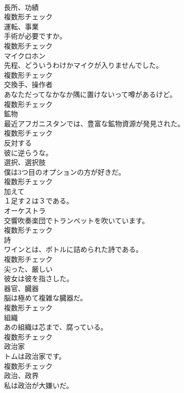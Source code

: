 \documentclass[8pt]{extreport}
\begin{document}
\begin{CJK}{UTF8}{min}
\\	[名詞]	⻑所、功績	
\\	複数形チェック
\\	[名詞]	運転、事業	
\\	手術が必要ですか。	
\\	複数形チェック
\\	[名詞]	マイクロホン	
\\	先程、どういうわけかマイクが入りませんでした。	
\\	複数形チェック
\\	[名詞]	交換手、操作者	
\\	あなただってなかなか隅に置けないって噂があるけど。	
\\	複数形チェック
\\	[名詞]	鉱物	
\\	最近アフガニスタンでは、豊富な鉱物資源が発見された。	
\\	複数形チェック
\\	[動詞]	反対する	
\\	彼に逆らうな。	
\\	[名詞]	選択、選択肢	
\\	僕は3つ目のオプションの方が好きだ。	
\\	複数形チェック
\\	[前置詞]	加えて	
\\	１足す２は３である。	
\\	[名詞]	オーケストラ	
\\	交響吹奏楽団でトランペットを吹いています。	
\\	複数形チェック
\\	[名詞]	詩	
\\	ワインとは、ボトルに詰められた詩である。	
\\	複数形チェック
\\	[形容詞]	尖った、厳しい	
\\	彼女は彼を指さした。	
\\	[名詞]	器官、臓器	
\\	脳は極めて複雑な臓器だ。	
\\	複数形チェック
\\	[名詞]	組織	
\\	あの組織は芯まで、腐っている。	
\\	複数形チェック
\\	[名詞]	政治家	
\\	トムは政治家です。	
\\	複数形チェック
\\	[名詞]	政治、政界	
\\	私は政治が大嫌いだ。	

\end{CJK}
\end{document}
